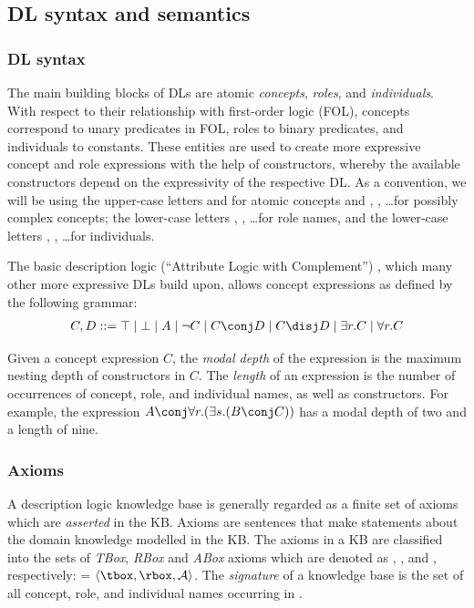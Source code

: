 \subsection{DL syntax and semantics}

\subsubsection{DL syntax}

The main building blocks of DLs are atomic \emph{concepts}, \emph{roles}, and \emph{individuals}. With respect to their relationship with first-order logic (FOL), concepts correspond to unary predicates in FOL, roles to binary predicates, and individuals to constants. These entities are used to create more expressive concept and role expressions with the help of constructors, whereby the available constructors depend on the expressivity of the respective DL. As a convention, we will be using the upper-case letters  and  for atomic concepts and , , \ldots for possibly complex concepts; the lower-case letters , , \ldots for role names, and the lower-case letters , , \ldots for individuals.

The basic description logic  (\enquote{Attribute Logic with Complement}) \cite{schmidt-schauss91bc}, which many other more expressive DLs build upon, allows concept expressions as defined by the following grammar:
\begin{align*}
C, D ::= \top \mid \bot \mid A \mid \neg C \mid C \conj D \mid C \disj D \mid \exists r.C \mid \forall r.C
\end{align*}

Given a concept expression $C$, the \emph{modal depth} of the expression is the maximum nesting depth of constructors in $C$. The \emph{length} of an expression is the number of occurrences of concept, role, and individual names, as well as constructors. For example, the expression $A \conj \forall r.(\exists s.(B \conj C))$ has a modal depth of two and a length of nine.
 
\subsubsection{Axioms}

A description logic knowledge base \K is generally regarded as a finite set of axioms which are \emph{asserted} in the KB. Axioms are sentences that make statements about the domain knowledge modelled in the KB. The axioms in a KB are classified into the sets of \emph{TBox}, \emph{RBox} and \emph{ABox} axioms which are denoted as \tbox, \rbox, and \abox, respectively: \K = $\langle \tbox, \rbox, \mathcal{A}\rangle$. The \emph{signature} \sig{\K} of a knowledge base \K is the set of all concept, role, and individual names occurring in \K.

